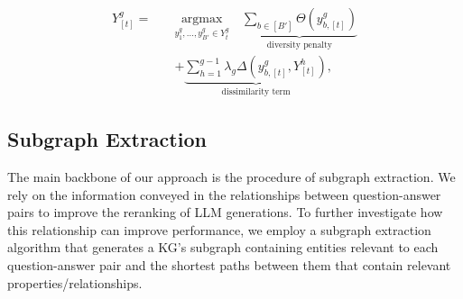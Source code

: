 \begin{equation}
    \begin{aligned}
        Y_{[t]}^g = \quad & \underset{y_1^{g}, \dots, y_{B\prime}^g \in Y_t^g} {\text{argmax}} \quad \underbrace{\sum_{b \in [B\prime]} \Theta(y_{b, [t]}^g)}_{\text{diversity penalty}} \\ 
        & + \underbrace{\sum_{h=1}^{g-1} \lambda_g \Delta(y_{b,[t]}^g, Y_{[t]}^h)}_{\text{dissimilarity term}},
    \end{aligned} 
    \label{eq:methods_kg_path_fusion:diverse_beam_search}
\end{equation}



\subsection{Subgraph Extraction} \label{sec:subgraph_extract}
The main backbone of our approach is the procedure of subgraph extraction. We rely on the information conveyed in the relationships between question-answer pairs to improve the reranking of LLM generations. To further investigate how this relationship can improve performance, we employ a subgraph extraction algorithm that generates a KG's subgraph containing entities relevant to each question-answer pair and the shortest paths between them that contain relevant properties/relationships. 

